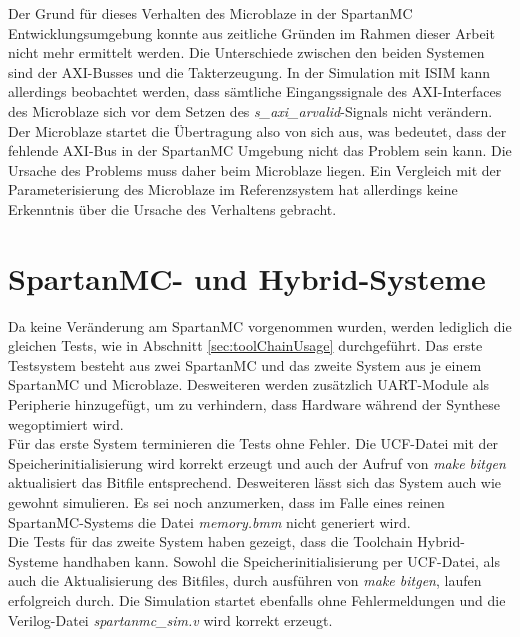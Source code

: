 Der Grund für dieses Verhalten des Microblaze in der SpartanMC Entwicklungsumgebung konnte aus zeitliche Gründen im Rahmen dieser Arbeit nicht mehr ermittelt werden. Die Unterschiede zwischen den beiden Systemen sind der AXI-Busses und die Takterzeugung. In der Simulation mit ISIM kann allerdings beobachtet werden, dass sämtliche Eingangssignale des AXI-Interfaces des Microblaze sich vor dem Setzen des \textit{s\_axi\_arvalid}-Signals nicht verändern. Der Microblaze startet die Übertragung also von sich aus, was bedeutet, dass der fehlende AXI-Bus in der SpartanMC Umgebung nicht das Problem sein kann. Die Ursache des Problems muss daher beim Microblaze liegen. Ein Vergleich mit der Parameterisierung des Microblaze im Referenzsystem hat allerdings keine Erkenntnis über die Ursache des Verhaltens gebracht.
\section{SpartanMC- und Hybrid-Systeme}
Da keine Veränderung am SpartanMC vorgenommen wurden, werden lediglich die gleichen Tests, wie in Abschnitt \ref{sec:toolChainUsage} durchgeführt. Das erste Testsystem besteht aus zwei SpartanMC und das zweite System aus je einem SpartanMC und Microblaze. Desweiteren werden zusätzlich UART-Module als Peripherie hinzugefügt, um zu verhindern, dass Hardware während der Synthese wegoptimiert wird.\\
Für das erste System terminieren die Tests ohne Fehler. Die UCF-Datei mit der Speicherinitialisierung wird korrekt erzeugt und auch der Aufruf von \textit{make bitgen} aktualisiert das Bitfile entsprechend. Desweiteren lässt sich das System auch wie gewohnt simulieren. Es sei noch anzumerken, dass im Falle eines reinen SpartanMC-Systems die Datei \textit{memory.bmm} nicht generiert wird.\\
Die Tests für das zweite System haben gezeigt, dass die Toolchain Hybrid-Systeme handhaben kann. Sowohl die Speicherinitialisierung per UCF-Datei, als auch die Aktualisierung des Bitfiles, durch ausführen von \textit{make bitgen}, laufen erfolgreich durch. Die Simulation startet ebenfalls ohne Fehlermeldungen und die Verilog-Datei \textit{spartanmc\_sim.v} wird korrekt erzeugt. 